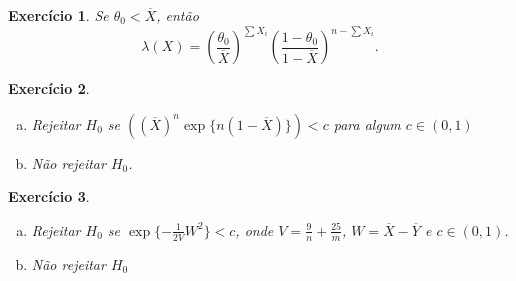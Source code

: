 \documentclass[letter,11pt]{article}
\newtheorem{exer}{Exercício}
\begin{document}
\begin{exer} \rm 

Se $\theta_0< \overline{X}$, então 
$$ \lambda(X)=\left(\frac{\theta_0}{\overline{X}}\right)^{\sum X_i}\left(\frac{1-\theta_0}{1-\overline{X}}\right)^{n-\sum X_i}. $$
\end{exer}


\begin{exer} \rm 

\begin{enumerate}[a)]
% 
\item Rejeitar $H_0$ se $
((\overline{X})^n\exp\{n(1-\overline{X})\})< c $ para algum $c \in (0,1)$

\item Não rejeitar $H_0$.
\end{enumerate}
\end{exer}


\begin{exer} \rm 

\begin{enumerate}[a)]

\item Rejeitar $H_0$ se $\exp\{-\frac{1}{2V}W^2\}< c$, onde $V=\frac{9}{n}+\frac{25}{m}$, $W=\overline{X}-\overline{Y}$ e $c\in (0,1)$.

\item Não rejeitar $H_0$
\end{enumerate}
\end{exer}
\end{document}
